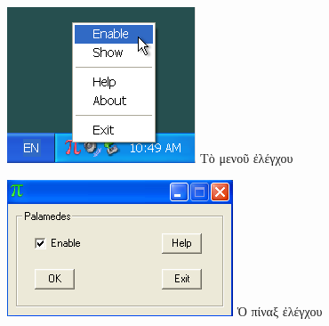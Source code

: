 \documentclass[12pt,a4paper]{article}
\begin{document}
\begin{itemize}
                  \begin{figure}[ht]
                    \begin{center}
                    \begin{minipage}[b]{0.40\linewidth}
                      \centering
                      \includegraphics[width=\textwidth]{p-inactive-menu.png}
                      Τὸ μενοῦ ἐλέγχου
                    \end{minipage}
                    \hspace{0.5cm}
                    \begin{minipage}[b]{0.40\linewidth}
                      \centering
                      \includegraphics[width=\textwidth]{p-main.png}
                      Ὁ πίναξ ἐλέγχου
                    \end{minipage}


\end{center}
\end{figure}
\end{itemize}
\end{document}
